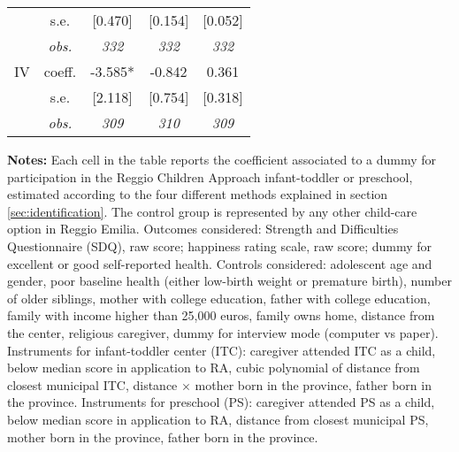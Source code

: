 \begin{table}[H]
\begin{centering}
\begin{tabular}{ r c ccc}
	 & s.e.	 & [0.470]	 & [0.154]	 & [0.052]	\\
	 & \textit{obs.}	 & \textit{332}	 & \textit{332}	 & \textit{332}	\\
IV	 & coeff.	 & -3.585*	 & -0.842	 & 0.361	\\
	 & s.e.	 & [2.118]	 & [0.754]	 & [0.318]	\\
	 & \textit{obs.}	 & \textit{309}	 & \textit{310}	 & \textit{309}	\\
\hline 
\end{tabular} 
\par\end{centering} 
\vspace{2ex}
\begin{footnotesize}
\textbf{Notes:} Each cell in the table reports the coefficient associated to a dummy for participation in the Reggio Children Approach infant-toddler or preschool, estimated according to the four different methods explained in section  \ref{sec:identification}. 
The control group is represented by any other child-care option in Reggio Emilia. 
Outcomes considered: Strength and Difficulties Questionnaire (SDQ), raw score; happiness rating scale, raw score; dummy for excellent or good self-reported health. Controls considered: adolescent age and gender, poor baseline health (either low-birth weight or premature birth), number of older siblings, mother with college education, father with college education, family with income higher than 25,000 euros, family owns home, distance from the center, religious caregiver, dummy for interview mode (computer vs paper). 
Instruments for infant-toddler center (ITC): caregiver attended ITC as a child, below median score in application to RA, cubic polynomial of distance from closest municipal ITC, distance $\times$ mother born in the province, father born in the province.
Instruments for preschool (PS): caregiver attended PS as a child, below median score in application to RA, distance from closest municipal PS, mother born in the province, father born in the province.
\end{footnotesize}
\end{table}

